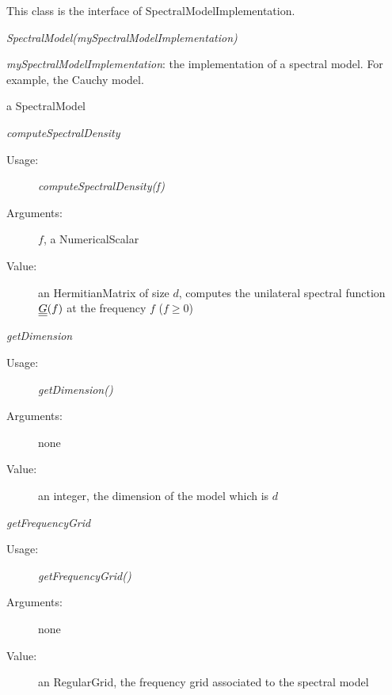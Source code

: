 This class is the interface of SpectralModelImplementation. \\
\begin{description}

\item[Usage:]  \textit{SpectralModel(mySpectralModelImplementation)}
\bigskip

\item[Arguments:] \textit{mySpectralModelImplementation}: the implementation of a spectral model. For example, the Cauchy model.

\bigskip


\item[Value:] a SpectralModel
\bigskip

\item[Some methods :]  \rule{0pt}{1em}

\begin{description}

\item \textit{computeSpectralDensity}
\begin{description}
\item[Usage:] \textit{computeSpectralDensity(f)}
\item[Arguments:] $f$,  a NumericalScalar
\item[Value:] an HermitianMatrix of size $d$, computes the unilateral spectral function ${\underline{\underline{G}}}(f)$ at the frequency $f$ ($f \geq 0$)
\end{description}
\bigskip


\item \textit{getDimension}
\begin{description}
\item[Usage:] \textit{getDimension()}
\item[Arguments:] none
\item[Value:]   an integer, the dimension of the model which is $d$
\end{description}
\bigskip


\item \textit{getFrequencyGrid}
\begin{description}
\item[Usage:] \textit{getFrequencyGrid()}
\item[Arguments:] none
\item[Value:]   an RegularGrid, the frequency grid associated to the spectral model
\end{description}
\bigskip

\end{description}

\end{description}


